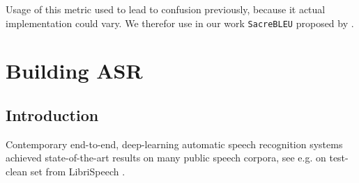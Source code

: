 Usage of this metric used to lead to confusion previously, because it actual implementation could vary. We therefor use in our work \texttt{SacreBLEU} proposed by .

\chapter{Building ASR}
\label{chapter:asr}


\section{Introduction}



Contemporary end-to-end, deep-learning automatic speech recognition systems achieved state-of-the-art results on many public speech corpora, see e.g. 
on test-clean set from LibriSpeech .

